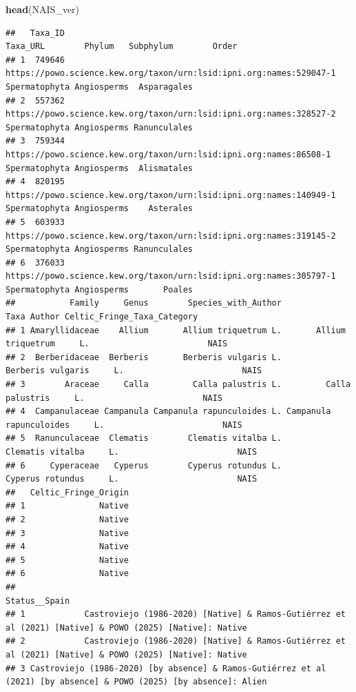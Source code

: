 \documentclass[
]{article}
\newenvironment{Shaded}{\begin{snugshade}}{\end{snugshade}}
\newcommand{\FunctionTok}[1]{\textcolor[rgb]{0.13,0.29,0.53}{\textbf{#1}}}
\newcommand{\NormalTok}[1]{#1}
\begin{document}
\begin{Shaded}
\begin{Highlighting}[]
\FunctionTok{head}\NormalTok{(NAIS\_ver)}
\end{Highlighting}
\end{Shaded}

\begin{verbatim}
##   Taxa_ID                                                            Taxa_URL        Phylum   Subphylum        Order
## 1  749646 https://powo.science.kew.org/taxon/urn:lsid:ipni.org:names:529047-1 Spermatophyta Angiosperms  Asparagales
## 2  557362 https://powo.science.kew.org/taxon/urn:lsid:ipni.org:names:328527-2 Spermatophyta Angiosperms Ranunculales
## 3  759344  https://powo.science.kew.org/taxon/urn:lsid:ipni.org:names:86508-1 Spermatophyta Angiosperms  Alismatales
## 4  820195 https://powo.science.kew.org/taxon/urn:lsid:ipni.org:names:140949-1 Spermatophyta Angiosperms    Asterales
## 5  603933 https://powo.science.kew.org/taxon/urn:lsid:ipni.org:names:319145-2 Spermatophyta Angiosperms Ranunculales
## 6  376033 https://powo.science.kew.org/taxon/urn:lsid:ipni.org:names:305797-1 Spermatophyta Angiosperms       Poales
##           Family     Genus        Species_with_Author                    Taxa Author Celtic_Fringe_Taxa_Category
## 1 Amaryllidaceae    Allium       Allium triquetrum L.       Allium triquetrum     L.                        NAIS
## 2  Berberidaceae  Berberis       Berberis vulgaris L.       Berberis vulgaris     L.                        NAIS
## 3        Araceae     Calla         Calla palustris L.         Calla palustris     L.                        NAIS
## 4  Campanulaceae Campanula Campanula rapunculoides L. Campanula rapunculoides     L.                        NAIS
## 5  Ranunculaceae  Clematis        Clematis vitalba L.        Clematis vitalba     L.                        NAIS
## 6     Cyperaceae   Cyperus        Cyperus rotundus L.        Cyperus rotundus     L.                        NAIS
##   Celtic_Fringe_Origin
## 1               Native
## 2               Native
## 3               Native
## 4               Native
## 5               Native
## 6               Native
##                                                                                                        Status__Spain
## 1            Castroviejo (1986-2020) [Native] & Ramos-Gutiérrez et al (2021) [Native] & POWO (2025) [Native]: Native
## 2            Castroviejo (1986-2020) [Native] & Ramos-Gutiérrez et al (2021) [Native] & POWO (2025) [Native]: Native
## 3 Castroviejo (1986-2020) [by absence] & Ramos-Gutiérrez et al (2021) [by absence] & POWO (2025) [by absence]: Alien

\end{verbatim}
\end{document}

